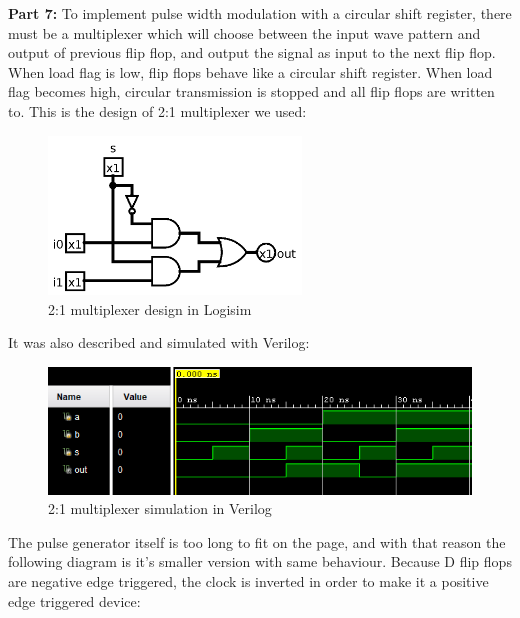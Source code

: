 \documentclass{article}
\begin{document}
\textbf{Part 7:}
	To implement pulse width modulation with a circular shift register, there must be a multiplexer which will choose between the input wave pattern and output of previous flip flop, and output the signal as input to the next flip flop. When load flag is low, flip flops behave like a circular shift register. When load flag becomes high, circular transmission is stopped and all flip flops are written to. This is the design of 2:1 multiplexer we used: \\
	\begin{figure}[h]
		\centering
		\includegraphics[width=0.6\textwidth]{mux.png}
		\caption{2:1 multiplexer design in Logisim}
		\centering
	\end{figure}	
	
It was also described and simulated with Verilog: \\	
	
	\begin{figure}[h]
		\centering
		\includegraphics[width=1\textwidth]{part7_mux.png}
		\caption{2:1 multiplexer simulation in Verilog}
		\centering
	\end{figure}	
	
	The pulse generator itself is too long to fit on the page, and with that reason the following diagram is it's smaller version with same behaviour. Because D flip flops are negative edge triggered, the clock is inverted in order to make it a positive edge triggered device: \\
	
\end{document}
